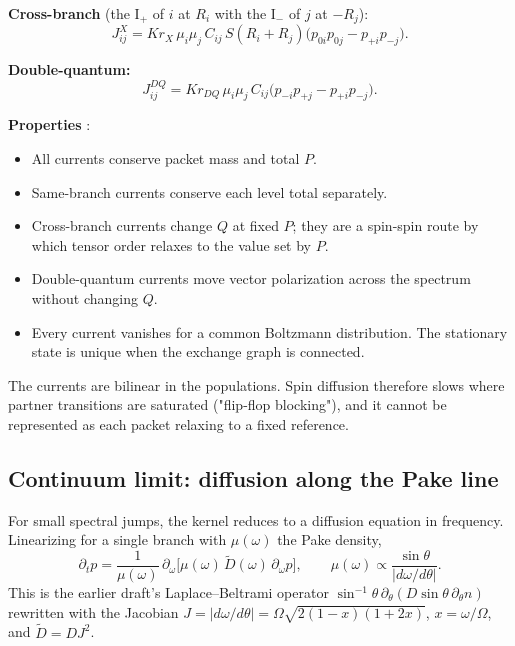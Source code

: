 \documentclass[11pt]{article}
\begin{document}
\textbf{Cross-branch} (the I$_+$ of $i$ at $R_i$ with the I$_-$ of $j$ at $-R_j$):
\begin{equation}
J^{X}_{ij}=K r_X\,\mu_i\mu_j\,C_{ij}\,S(R_i+R_j)\big(p_{0i}p_{0j}-p_{+i}p_{-j}\big).
\end{equation}

\textbf{Double-quantum:}
\begin{equation}
J^{DQ}_{ij}=K r_{DQ}\,\mu_i\mu_j\,C_{ij}\big(p_{-i}p_{+j}-p_{+i}p_{-j}\big).
\end{equation}

\textbf{Properties} \cite{SuterErnst1985,AbragamGoldman1982}:
\begin{itemize}
\item All currents conserve packet mass and total $P$.
\item Same-branch currents conserve each level total separately.
\item Cross-branch currents change $Q$ at fixed $P$; they are a spin-spin route by which
tensor order relaxes to the value set by $P$.
\item Double-quantum currents move vector polarization across the spectrum without changing
$Q$.
\item Every current vanishes for a common Boltzmann distribution. The stationary state is
unique when the exchange graph is connected.
\end{itemize}
The currents are bilinear in the populations. Spin diffusion therefore slows where partner
transitions are saturated ("flip-flop blocking"), and it cannot be represented as each packet
relaxing to a fixed reference.

\subsection{Continuum limit: diffusion along the Pake line}
\label{sec:continuum}
For small spectral jumps, the kernel reduces to a diffusion equation in frequency. Linearizing
for a single branch with $\mu(\omega)$ the Pake density,
\begin{equation}
\partial_t p=\frac{1}{\mu(\omega)}\,\partial_\omega\!\big[\mu(\omega)\,\tilde D(\omega)\,\partial_\omega p\big],
\qquad \mu(\omega)\propto\frac{\sin\theta}{|d\omega/d\theta|}.
\label{eq:continuum}
\end{equation}
This is the earlier draft's Laplace--Beltrami operator
$\sin^{-1}\theta\,\partial_\theta(D\sin\theta\,\partial_\theta n)$ rewritten with the
Jacobian $J=|d\omega/d\theta|=\Omega\sqrt{2(1-x)(1+2x)}$, $x=\omega/\Omega$, and
$\tilde D=DJ^2$.
\end{document}
